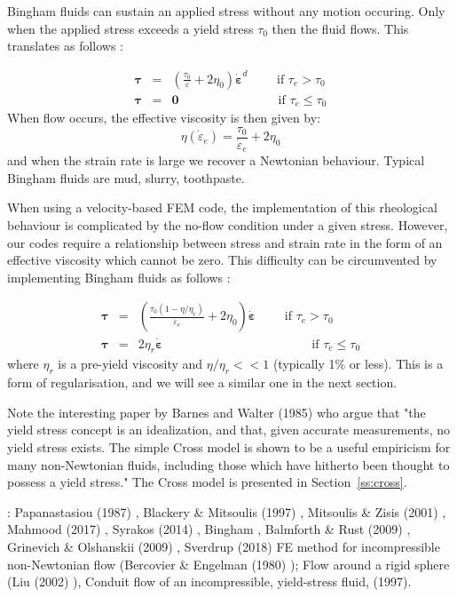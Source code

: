

Bingham \cite{bingham} fluids can sustain an applied stress without any motion occuring. Only when the applied stress exceeds
a yield stress $\tau_0$ then the fluid flows. This translates as follows \cite{reddybook2}:

\begin{eqnarray}
{\bm \tau} &=& \left(  \frac{\tau_0}{\dot{\varepsilon}} + 2 \eta_0  \right)\dot{\bm \varepsilon}^d \qquad 
\text{ if } {\tau}_{e}>\tau_0 \\
{\bm \tau} &=& {\bm 0} \qquad\qquad\qquad\qquad  \text{if } \tau_{e} \leq \tau_0 
\end{eqnarray}
When flow occurs, the effective viscosity is then given by:
\begin{equation}
\eta(\dot{\varepsilon}_e) = \frac{\tau_0}{\dot{\varepsilon}_e} + 2 \eta_0 
\end{equation}
and when the strain rate is large we recover a Newtonian behaviour.
Typical Bingham fluids are mud, slurry, toothpaste.  

When using a velocity-based FEM code, the implementation of this rheological behaviour 
is complicated by the no-flow condition under a given stress. However, our codes
require a relationship between stress and strain rate in the form of an effective viscosity
which cannot be zero. 
This difficulty can be circumvented by implementing Bingham fluids as follows \cite{reddybook2}:

\begin{eqnarray}
{\bm \tau} &=& \left(  \frac{\tau_0(1-\eta/\eta_r)}{\dot{\varepsilon}_e} 
+ 2 \eta_0  \right)\dot{\bm \varepsilon} \qquad \text{ if } \tau_{e}>\tau_0 \\
{\bm \tau} &=& 2 \eta_r \dot{\bm \varepsilon}  \qquad\qquad\qquad\qquad\qquad\qquad  
\text{if } \tau_{e} \leq \tau_0 
\end{eqnarray}
where $\eta_r$ is a pre-yield viscosity and $\eta/\eta_r<<1$ (typically 1\% or less). This is a form of 
regularisation, and we will see a similar one in the next section.

Note the interesting paper by Barnes and Walter (1985) \cite{bawa85} who argue that 
"the yield stress concept is an idealization, and that, given accurate
measurements, no yield stress exists. The simple Cross model is shown to be a
useful empiricism for many non-Newtonian fluids, including those which have
hitherto been thought to possess a yield stress." The Cross model is presented 
in Section~\ref{ss:cross}.
 

\Literature: 
Papanastasiou (1987) \cite{papa87}, Blackery \& Mitsoulis (1997) \cite{blmi97},
Mitsoulis \& Zisis (2001) \cite{mizi01}, Mahmood \etal (2017) \cite{maky17},
Syrakos \etal (2014) \cite{syga14}, Bingham \cite{bingham}, Balmforth \& Rust (2009) \cite{baru09}, 
Grinevich \& Olshanskii (2009) \cite{grol09}, Sverdrup \etal (2018) \cite{svna18}
FE method for incompressible non-Newtonian flow (Bercovier \& Engelman (1980) \cite{been80});
Flow around a rigid sphere (Liu \etal (2002) \cite{limd02}),
Conduit flow of an incompressible, yield-stress fluid, \textcite{tawi97} (1997).


